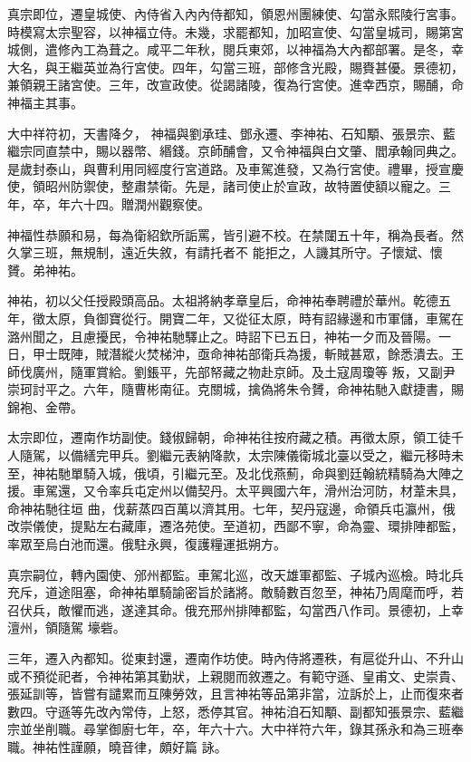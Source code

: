 \begin{pinyinscope}
 真宗即位，遷皇城使、內侍省入內內侍都知，領恩州團練使、勾當永熙陵行宮事。時模寫太宗聖容，以神福立侍。未幾，求罷都知，加昭宣使、勾當皇城司，賜第宮城側，遣修內工為葺之。咸平二年秋，閱兵東郊，以神福為大內都部署。是冬，幸大名，與王繼英並為行宮使。四年，勾當三班，部修含光殿，賜賚甚優。景德初，兼領親王諸宮使。三年，改宣政使。從謁諸陵，復為行宮使。進幸西京，賜酺，命神福主其事。



 大中祥符初，天書降夕，
 神福與劉承珪、鄧永遷、李神祐、石知顒、張景宗、藍繼宗同直禁中，賜以器幣、緡錢。京師酺會，又令神福與白文肇、閻承翰同典之。是歲封泰山，與曹利用同經度行宮道路。及車駕進發，又為行宮使。禮畢，授宣慶使，領昭州防禦使，整肅禁衛。先是，諸司使止於宣政，故特置使額以寵之。三年，卒，年六十四。贈潤州觀察使。



 神福性恭願和易，每為衛紹欽所詬罵，皆引避不校。在禁闥五十年，稱為長者。然久掌三班，無規制，遠近失敘，有請托者不
 能拒之，人譏其所守。子懷斌、懷贇。弟神祐。



 神祐，初以父任授殿頭高品。太祖將納孝章皇后，命神祐奉聘禮於華州。乾德五年，徵太原，負御寶從行。開寶二年，又從征太原，時有詔緣邊和市軍儲，車駕在潞州聞之，且慮擾民，令神祐馳驛止之。時詔下已五日，神祐一夕而及晉陽。一日，甲士既陣，賊潛縱火焚梯沖，亟命神祐部衛兵為援，斬賊甚眾，餘悉潰去。王師伐廣州，隨軍賞給。劉鋹平，先部帑藏之物赴京師。及土寇周瓊等
 叛，又副尹崇珂討平之。六年，隨曹彬南征。克關城，擒偽將朱令贇，命神祐馳入獻捷書，賜錦袍、金帶。



 太宗即位，遷南作坊副使。錢俶歸朝，命神祐往按府藏之積。再徵太原，領工徒千人隨駕，以備繕完甲兵。劉繼元表納降款，太宗陳儀衛城北臺以受之，繼元移時未至，神祐馳單騎入城，俄頃，引繼元至。及北伐燕薊，命與劉廷翰統精騎為大陣之援。車駕還，又令率兵屯定州以備契丹。太平興國六年，滑州治河防，材葦未具，命神祐馳往垣
 曲，伐薪蒸四百萬以濟其用。七年，契丹寇邊，命領兵屯瀛州，俄改崇儀使，提點左右藏庫，遷洛苑使。至道初，西鄙不寧，命為靈、環排陣都監，率眾至烏白池而還。俄駐永興，復護糧運抵朔方。



 真宗嗣位，轉內園使、邠州都監。車駕北巡，改天雄軍都監、子城內巡檢。時北兵充斥，道途阻塞，命神祐單騎諭密旨於諸將。敵騎數百忽至，神祐乃周麾而呼，若召伏兵，敵懼而逃，遂達其命。俄充邢州排陣都監，勾當西八作司。景德初，上幸澶州，領隨駕
 壕砦。



 三年，遷入內都知。從東封還，遷南作坊使。時內侍將遷秩，有扈從升山、不升山或不預從祀者，令神祐第其勤狀，上親閱而敘遷之。有範守遜、皇甫文、史崇貴、張延訓等，皆嘗有譴累而互陳勞效，且言神祐等品第非當，泣訴於上，止而復來者數四。守遜等先改內常侍，上怒，悉停其官。神祐洎石知顒、副都知張景宗、藍繼宗並坐削職。尋掌御廚七年，卒，年六十六。大中祥符六年，錄其孫永和為三班奉職。神祐性謹願，曉音律，頗好篇
 詠。




\end{pinyinscope}
